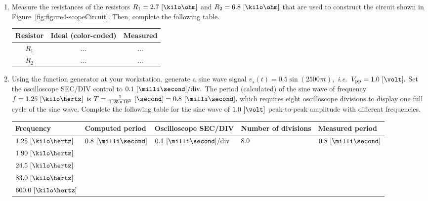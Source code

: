\begin{enumerate}

\item Measure the resistances of the resistors $R_1 = 2.7~[\kilo\ohm]$ and $R_2 = 6.8~[\kilo\ohm]$ that are   used to construct the circuit shown in Figure~\ref{fig:figure4-scopeCircuit}. Then, complete the following table.

  \begin{center}
    \begin{tabular}{c|c|c}
      \toprule
      Resistor &  Ideal (color-coded) & Measured\\
      \toprule
      $R_1$ & $\ldots$ & $\ldots$\\   %
      $R_2$ & $\ldots$ & $\ldots$\\   %
      \bottomrule
    \end{tabular}    
  \end{center}
  

\item Using the function generator at your workstation,  generate a sine wave  signal $v_s(t) = 0.5\sin(2500\pi t),$ \textit{i.e.~}$V_{\text{pp}} = 1.0~[\volt].$ Set the oscilloscope SEC/DIV control to $0.1~[\milli\second]/\text{div}.$ The period (calculated) of the sine wave of frequency $f=1.25~[\kilo\hertz]$  is $T = \frac{1}{1.25\times 10^{3}}~[\second] = 0.8~[\milli\second],$ which requires eight oscilloscope divisions to display one full cycle of the sine wave. Complete the following table for the sine wave of $1.0~[\volt]$ peak-to-peak amplitude with different frequencies.

  
  \begin{center}
    \begin{tabular}{|p{2.0cm}|p{2.0cm}|p{2.0cm}|p{2.0cm}|p{2.0cm}|}
      \toprule
      Frequency & Computed period & Oscilloscope SEC/DIV & Number of divisions &  Measured period\\
      \toprule
      $1.25~[\kilo\hertz]$ & $0.8~[\milli\second]$ & $0.1~[\milli\second]/\text{div}$ & $8.0$ & $0.8~[\milli\second]$ \\
      \hline
      $1.90~[\kilo\hertz]$ &  & & & \\
      \hline
      $24.5~[\kilo\hertz]$ &  & & & \\
      \hline
      $83.0~[\kilo\hertz]$ &  & & & \\
      \hline
      $600.0~[\kilo\hertz]$ &  & & & \\
      \bottomrule
    \end{tabular}    
  \end{center}



\end{enumerate}
